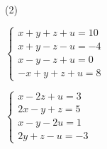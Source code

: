 \documentclass[12pt,a4paper]{article}
\begin{document}
\begin{exercise}
\begin{tasks}(2)

\task $\begin{cases}
x + y + z + u = 10\\
x + y - z - u = -4\\
x - y - z + u = 0\\
-x + y + z + u = 8
\end{cases}$

\task $\begin{cases}
x - 2z + u = 3\\
2x - y + z = 5\\
x - y - 2u = 1\\
2y + z - u = -3
\end{cases}$

\end{tasks}
\end{exercise}
\end{document}
